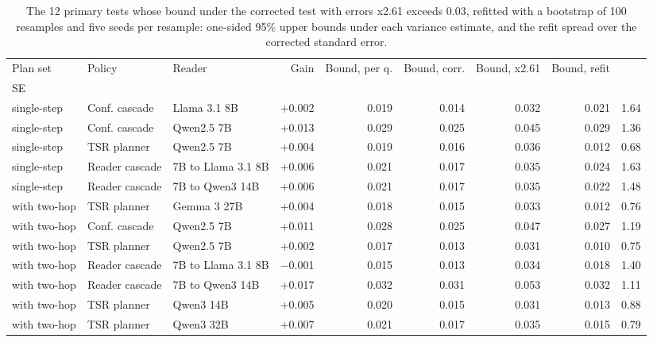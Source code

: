 \begin{table}[t]
\centering\small
\setlength{\tabcolsep}{4pt}
\caption{The 12 primary tests whose bound under the corrected test with errors x2.61 exceeds 0.03, refitted with a bootstrap of 100 resamples and five seeds per resample: one-sided 95\% upper bounds under each variance estimate, and the refit spread over the corrected standard error.}
\label{tab:refit_bounds}
\begin{tabular*}{\linewidth}{@{\extracolsep{\fill}}lllrrrrrr}
\toprule
Plan set & Policy & Reader & Gain & Bound, per q. & Bound, corr. & Bound, x2.61 & Bound, refit & \begin{tabular}[b]{@{}r@{}}Refit /corr. \\ SE\end{tabular} \\
\midrule
single-step & Conf. cascade & Llama 3.1 8B & +0.002 & 0.019 & 0.014 & 0.032 & 0.021 & 1.64 \\
single-step & Conf. cascade & Qwen2.5 7B & +0.013 & 0.029 & 0.025 & 0.045 & 0.029 & 1.36 \\
single-step & TSR planner & Qwen2.5 7B & +0.004 & 0.019 & 0.016 & 0.036 & 0.012 & 0.68 \\
single-step & Reader cascade & 7B to Llama 3.1 8B & +0.006 & 0.021 & 0.017 & 0.035 & 0.024 & 1.63 \\
single-step & Reader cascade & 7B to Qwen3 14B & +0.006 & 0.021 & 0.017 & 0.035 & 0.022 & 1.48 \\
with two-hop & TSR planner & Gemma 3 27B & +0.004 & 0.018 & 0.015 & 0.033 & 0.012 & 0.76 \\
with two-hop & Conf. cascade & Qwen2.5 7B & +0.011 & 0.028 & 0.025 & 0.047 & 0.027 & 1.19 \\
with two-hop & TSR planner & Qwen2.5 7B & +0.002 & 0.017 & 0.013 & 0.031 & 0.010 & 0.75 \\
with two-hop & Reader cascade & 7B to Llama 3.1 8B & $-$0.001 & 0.015 & 0.013 & 0.034 & 0.018 & 1.40 \\
with two-hop & Reader cascade & 7B to Qwen3 14B & +0.017 & 0.032 & 0.031 & 0.053 & 0.032 & 1.11 \\
with two-hop & TSR planner & Qwen3 14B & +0.005 & 0.020 & 0.015 & 0.031 & 0.013 & 0.88 \\
with two-hop & TSR planner & Qwen3 32B & +0.007 & 0.021 & 0.017 & 0.035 & 0.015 & 0.79 \\
\bottomrule
\end{tabular*}
\end{table}
